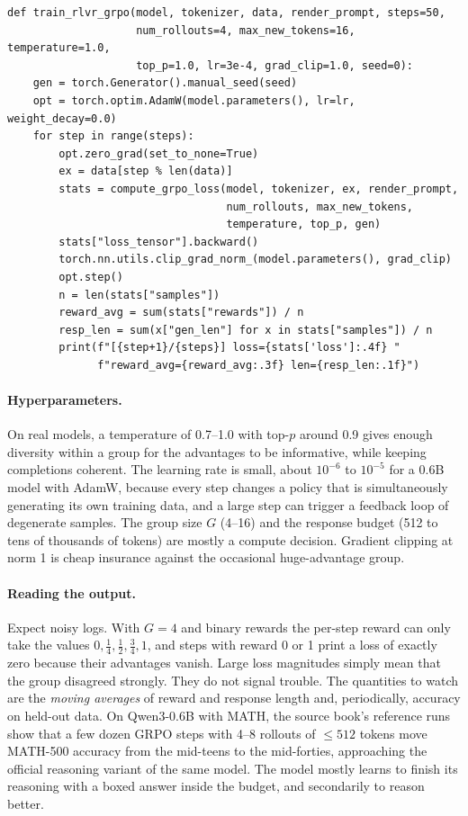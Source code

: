 \begin{lstlisting}[caption={The training loop (abridged from \texttt{train\_rlvr\_grpo}; CSV logging and checkpointing elided).},label={lst:grpo:loop}]
def train_rlvr_grpo(model, tokenizer, data, render_prompt, steps=50,
                    num_rollouts=4, max_new_tokens=16, temperature=1.0,
                    top_p=1.0, lr=3e-4, grad_clip=1.0, seed=0):
    gen = torch.Generator().manual_seed(seed)
    opt = torch.optim.AdamW(model.parameters(), lr=lr, weight_decay=0.0)
    for step in range(steps):
        opt.zero_grad(set_to_none=True)
        ex = data[step % len(data)]
        stats = compute_grpo_loss(model, tokenizer, ex, render_prompt,
                                  num_rollouts, max_new_tokens,
                                  temperature, top_p, gen)
        stats["loss_tensor"].backward()
        torch.nn.utils.clip_grad_norm_(model.parameters(), grad_clip)
        opt.step()
        n = len(stats["samples"])
        reward_avg = sum(stats["rewards"]) / n
        resp_len = sum(x["gen_len"] for x in stats["samples"]) / n
        print(f"[{step+1}/{steps}] loss={stats['loss']:.4f} "
              f"reward_avg={reward_avg:.3f} len={resp_len:.1f}")
\end{lstlisting}

\paragraph{Hyperparameters.} On real models, a temperature of 0.7--1.0 with top-$p$
around 0.9 gives enough diversity within a group for the advantages to be informative,
while keeping completions coherent. The learning rate is small, about $10^{-6}$ to
$10^{-5}$ for a 0.6B model with AdamW, because every step changes a policy that is
simultaneously generating its own training data, and a large step can trigger a feedback
loop of degenerate samples. The group size $G$ (4--16) and the response budget (512 to
tens of thousands of tokens) are mostly a compute decision. Gradient clipping at norm 1 is
cheap insurance against the occasional huge-advantage group.

\paragraph{Reading the output.} Expect noisy logs. With $G=4$ and binary rewards the
per-step reward can only take the values $0,\frac14,\frac12,\frac34,1$, and steps with
reward 0 or 1 print a loss of exactly zero because their advantages vanish. Large loss
magnitudes simply mean that the group disagreed strongly. They do not signal trouble. The
quantities to watch are the \emph{moving averages} of reward and response length and,
periodically, accuracy on held-out data. On Qwen3-0.6B with MATH, the source book's
reference runs show that a few dozen GRPO steps with 4--8 rollouts of $\le512$ tokens move
MATH-500 accuracy from the mid-teens to the mid-forties, approaching the official reasoning
variant of the same model. The model mostly learns to finish its reasoning with a boxed
answer inside the budget, and secondarily to reason better.

